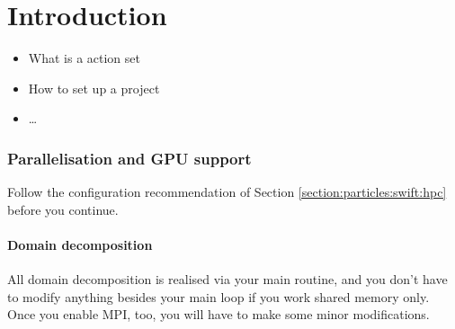 \chapter{Introduction}
\label{section:python-api-examples:introduction}


\begin{itemize}
  \item What is a action set
  \item How to set up a project
  \item \ldots
\end{itemize}




\subsection{Parallelisation and GPU support}

Follow the configuration recommendation of Section
\ref{section:particles:swift:hpc} before you continue.

\subsubsection{Domain decomposition}

All domain decomposition is realised via your main routine, and you don't have
to modify anything besides your main loop if you work shared memory only.
Once you enable MPI, too, you will have to make some minor modifications.


